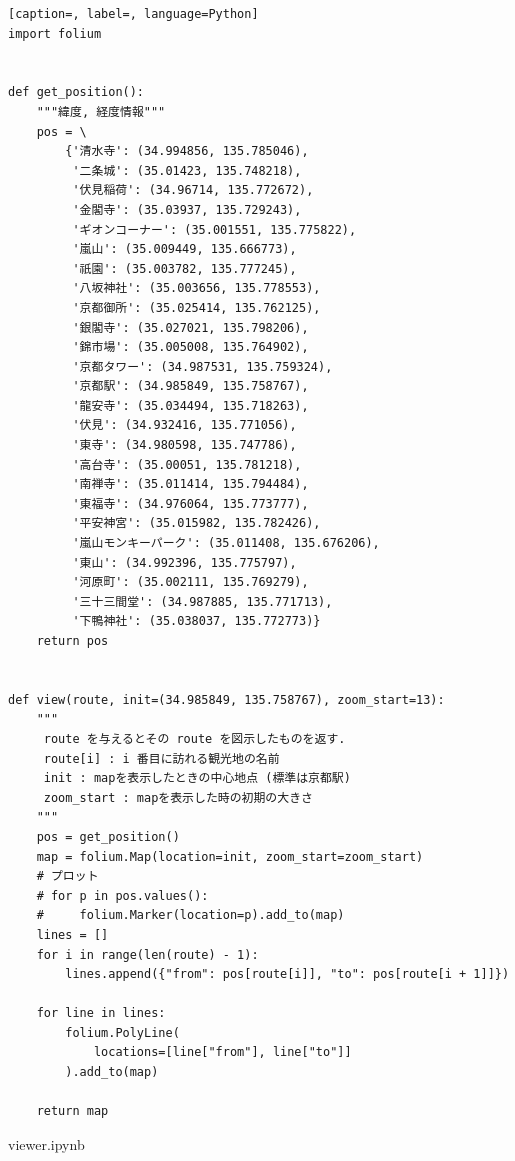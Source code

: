 \documentclass[a4paper,12pt]{jsreport}
\theoremstyle{definition}
\begin{document}
\begin{lstlisting}[caption=, label=, language=Python]
import folium


def get_position():
    """緯度, 経度情報"""
    pos = \
        {'清水寺': (34.994856, 135.785046),
         '二条城': (35.01423, 135.748218),
         '伏見稲荷': (34.96714, 135.772672),
         '金閣寺': (35.03937, 135.729243),
         'ギオンコーナー': (35.001551, 135.775822),
         '嵐山': (35.009449, 135.666773),
         '祇園': (35.003782, 135.777245),
         '八坂神社': (35.003656, 135.778553),
         '京都御所': (35.025414, 135.762125),
         '銀閣寺': (35.027021, 135.798206),
         '錦市場': (35.005008, 135.764902),
         '京都タワー': (34.987531, 135.759324),
         '京都駅': (34.985849, 135.758767),
         '龍安寺': (35.034494, 135.718263),
         '伏見': (34.932416, 135.771056),
         '東寺': (34.980598, 135.747786),
         '高台寺': (35.00051, 135.781218),
         '南禅寺': (35.011414, 135.794484),
         '東福寺': (34.976064, 135.773777),
         '平安神宮': (35.015982, 135.782426),
         '嵐山モンキーパーク': (35.011408, 135.676206),
         '東山': (34.992396, 135.775797),
         '河原町': (35.002111, 135.769279),
         '三十三間堂': (34.987885, 135.771713),
         '下鴨神社': (35.038037, 135.772773)}
    return pos


def view(route, init=(34.985849, 135.758767), zoom_start=13):
    """
     route を与えるとその route を図示したものを返す.
     route[i] : i 番目に訪れる観光地の名前
     init : mapを表示したときの中心地点 (標準は京都駅)
     zoom_start : mapを表示した時の初期の大きさ
    """
    pos = get_position()
    map = folium.Map(location=init, zoom_start=zoom_start)
    # プロット
    # for p in pos.values():
    #     folium.Marker(location=p).add_to(map)
    lines = []
    for i in range(len(route) - 1):
        lines.append({"from": pos[route[i]], "to": pos[route[i + 1]]})

    for line in lines:
        folium.PolyLine(
            locations=[line["from"], line["to"]]
        ).add_to(map)

    return map
\end{lstlisting}
viewer.ipynb
\end{document}
